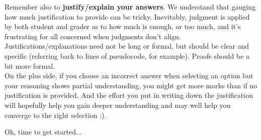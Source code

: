 \documentclass[letterpaper,11pt]{article}
\theoremstyle{plain}
\theoremstyle{definition}
\begin{document}
	Remember also to \textbf{justify/explain  your answers}. We understand that gauging how	much justification to provide can be tricky. Inevitably, judgment is applied by both	student and grader as to how much is enough, or too much, and it's frustrating for all concerned when judgments don't align. Justifications/explanations need not be long or formal, but should be clear and specific (referring back to lines of pseudocode, for example). Proofs should be a bit more formal.\\
	
	On the plus side, if you choose an incorrect answer when selecting an option but your reasoning shows partial understanding, you might get more marks than if no justification is provided. And the effort you put in writing down the justification will hopefully help you gain deeper understanding and may well help you converge to the right selection
	:).
	
	\vspace{.1in}
	
	Ok, time to get started...
	
	\newpage
	
\end{document}
